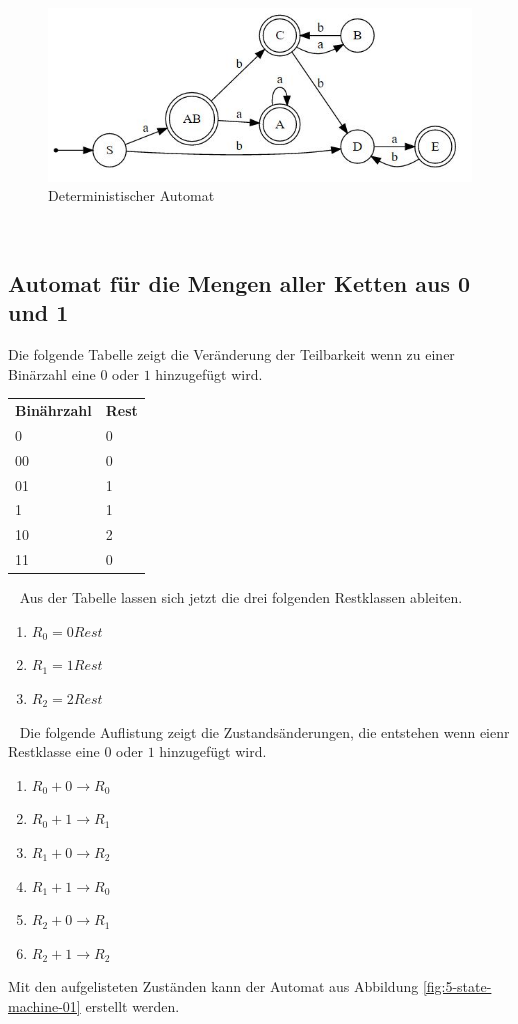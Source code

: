 \documentclass[11pt, a4paper, twoside]{article}   	%
\begin{document}
\begin{figure}[h]
\centering
\includegraphics[scale=0.55]{transformed_regular_exp_determeneistic.JPG}
\caption{Deterministischer Automat}
\label{fig:ada-state-machine}
\end{figure}
\ \newpage

\subsection{Automat für die Mengen aller Ketten aus 0 und 1}
Die folgende Tabelle zeigt die Veränderung der Teilbarkeit wenn zu einer Binärzahl eine $0$ oder $1$ hinzugefügt wird.
\newline
\newline
\begin{tabularx}{10cm}{XX}
    \textbf{Binährzahl} & \textbf{Rest} \\
    0          & 0 \\
    00         & 0 \\
    01         & 1 \\
    1          & 1 \\
    10         & 2 \\
    11         & 0 \\
\end{tabularx}
\ \newline
\newline
\newline
Aus der Tabelle lassen sich jetzt die drei folgenden Restklassen ableiten.
\begin{enumerate}
	\item$R_{0} = 0 Rest$
	\item$R_{1} = 1 Rest$
	\item$R_{2} = 2 Rest$
\end{enumerate}
\ \newline
Die folgende Auflistung zeigt die Zustandsänderungen, die entstehen wenn eienr Restklasse eine $0$ oder $1$ hinzugefügt wird.
\begin{enumerate}
	\item$R_{0} + 0 \rightarrow R_{0}$
	\item$R_{0} + 1 \rightarrow R_{1}$
	\item$R_{1} + 0 \rightarrow R_{2}$
	\item$R_{1} + 1 \rightarrow R_{0}$
	\item$R_{2} + 0 \rightarrow R_{1}$
	\item$R_{2} + 1 \rightarrow R_{2}$
\end{enumerate}
Mit den aufgelisteten Zuständen kann der Automat aus Abbildung \ref{fig:5-state-machine-01} erstellt werden.
\end{document}
